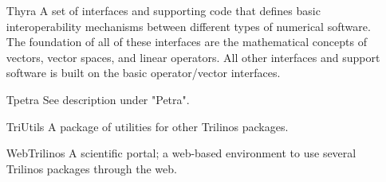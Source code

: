 \begin{itemize}
\item[Thyra] A set of interfaces and supporting code that defines basic 
interoperability mechanisms between different types of numerical software. The 
foundation of all of these interfaces are the mathematical concepts of 
vectors, vector spaces, and linear operators. All other interfaces and support 
software is built on the basic operator/vector interfaces.

\item[Tpetra]
See description under "Petra".

\item[TriUtils]
A package of utilities for other Trilinos packages. 

\item[WebTrilinos]
A scientific portal; a web-based environment to use several Trilinos
packages through the web. 

\end{itemize}


